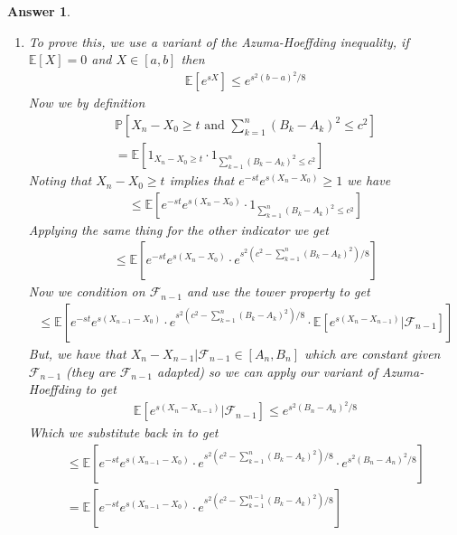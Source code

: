 \documentclass[12pt]{article}
\theoremstyle{colon}
\newtheorem*{answer}{Answer}
\begin{document}
\begin{answer}
  \leavevmode
  \begin{enumerate}[label=\arabic*)]
    \item To prove this, we use a variant of the Azuma-Hoeffding inequality, if $\mathbb{E}[X] = 0$ and $X \in [a,b]$ then
      \begin{gather*}
        \mathbb{E}[e^{sX}] \leq e^{s^2 (b-a)^2/8}
      \end{gather*}
      Now we by definition
      \begin{gather*}
        \mathbb{P} \left[ X_n - X_0 \geq t \text{ and } \sum_{k=1}^n (B_k - A_k)^2 \leq c^2 \right] \\
        = \mathbb{E}[ 1_{X_n - X_0 \geq t} \cdot 1_{\sum_{k=1}^n (B_k - A_k)^2 \leq c^2}]
      \end{gather*}
      Noting that $X_n - X_0 \geq t$ implies that $e^{-st}e^{s(X_n-X_0)} \geq 1$ we have
      \begin{gather*}
        \leq \mathbb{E}[ e^{-st}e^{s(X_n-X_0)} \cdot 1_{\sum_{k=1}^n (B_k - A_k)^2 \leq c^2}]
      \end{gather*}
      Applying the same thing for the other indicator we get
      \begin{gather*}
        \leq \mathbb{E}[ e^{-st}e^{s(X_n-X_0)} \cdot e^{s^2(c^2 - \sum_{k=1}^n (B_k - A_k)^2)/8}]
      \end{gather*}
      Now we condition on $\mathcal{F}_{n-1}$ and use the tower property to get
      \begin{gather*}
        \leq \mathbb{E}[ e^{-st}e^{s(X_{n-1}-X_0)} \cdot e^{s^2(c^2 - \sum_{k=1}^n (B_k - A_k)^2)/8} \cdot \mathbb{E}[e^{s(X_n - X_{n-1})} | \mathcal{F}_{n-1}]]
      \end{gather*}
      But, we have that $X_n - X_{n-1} | \mathcal{F}_{n-1} \in [A_n, B_n]$ which are constant given $\mathcal{F}_{n-1}$ (they are $\mathcal{F}_{n-1}$ adapted) so we can apply our variant of Azuma-Hoeffding to get
      \begin{gather*}
        \mathbb{E}[e^{s(X_n - X_{n-1})} | \mathcal{F}_{n-1}] \leq e^{s^2(B_n - A_n)^2/8}
      \end{gather*}
      Which we substitute back in to get
      \begin{gather*}
        \leq \mathbb{E}[ e^{-st}e^{s(X_{n-1}-X_0)} \cdot e^{s^2(c^2 - \sum_{k=1}^n (B_k - A_k)^2)/8} \cdot e^{s^2(B_n - A_n)^2/8}] \\
        = \mathbb{E}[ e^{-st}e^{s(X_{n-1}-X_0)} \cdot e^{s^2(c^2 - \sum_{k=1}^{n-1} (B_k - A_k)^2)/8} ]

\end{gather*}
\end{enumerate}
\end{answer}
\end{document}
